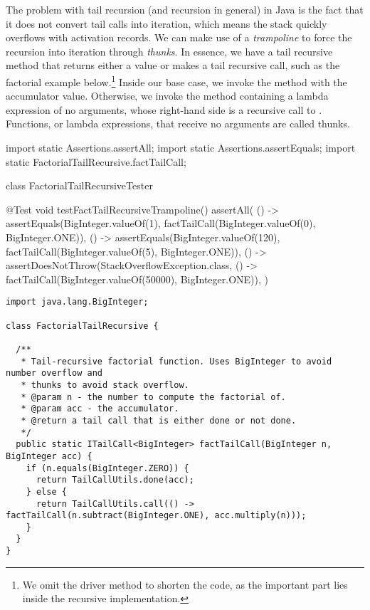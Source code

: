 The problem with tail recursion (and recursion in general) in Java is the fact that it does not convert tail calls into iteration, which means the stack quickly overflows with activation records. We can make use of a \textit{trampoline} to force the recursion into iteration through \textit{thunks}. In essence, we have a tail recursive method that returns either a value or makes a tail recursive call, such as the factorial example below.\footnote{We omit the driver method to shorten the code, as the important part lies inside the recursive implementation.} Inside our base case, we invoke the  method with the accumulator value. Otherwise, we invoke the  method containing a lambda expression of no arguments, whose right-hand side is a recursive call to . Functions, or lambda expressions, that receive no arguments are called thunks.

\begin{cl}{}
import static Assertions.assertAll;
import static Assertions.assertEquals;
import static FactorialTailRecursive.factTailCall;

class FactorialTailRecursiveTester {
  
  @Test 
  void testFactTailRecursiveTrampoline() {
    assertAll(
      () -> assertEquals(BigInteger.valueOf(1), factTailCall(BigInteger.valueOf(0), BigInteger.ONE)),
      () -> assertEquals(BigInteger.valueOf(120), factTailCall(BigInteger.valueOf(5), BigInteger.ONE)),
      () -> assertDoesNotThrow(StackOverflowException.class,
                               () -> factTailCall(BigInteger.valueOf(50000), BigInteger.ONE)),
    )
  }
}
\end{cl}

\begin{cl}{}
\begin{lstlisting}[language=MyJava]
import java.lang.BigInteger;

class FactorialTailRecursive {
 
  /**
   * Tail-recursive factorial function. Uses BigInteger to avoid number overflow and
   * thunks to avoid stack overflow.
   * @param n - the number to compute the factorial of.
   * @param acc - the accumulator.
   * @return a tail call that is either done or not done.
   */
  public static ITailCall<BigInteger> factTailCall(BigInteger n, BigInteger acc) {
    if (n.equals(BigInteger.ZERO)) {
      return TailCallUtils.done(acc);
    } else {
      return TailCallUtils.call(() -> factTailCall(n.subtract(BigInteger.ONE), acc.multiply(n)));
    }
  }
}
\end{lstlisting}
\end{cl}

